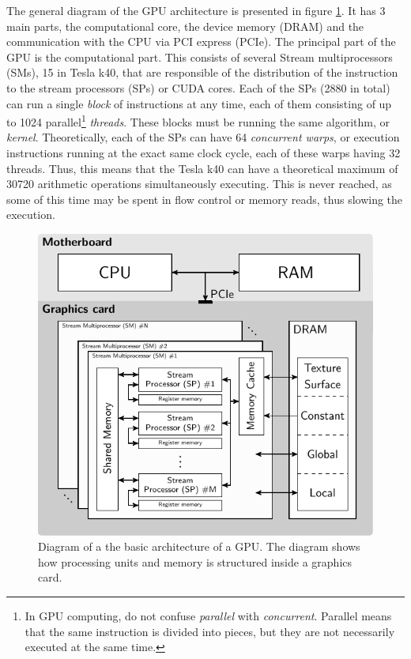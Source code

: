 The general diagram of the GPU architecture is presented in figure \ref{fig:GPUarch}. It has 3 main parts, the computational core, the device memory (DRAM) and the communication with the CPU via PCI express (PCIe).
The principal part of the GPU is the computational part. This consists of several Stream multiprocessors (SMs), 15 in Tesla k40, that are responsible of the distribution of the instruction to the stream processors (SPs) or CUDA cores. Each of the SPs (2880 in total) can run a single \textit{block} of instructions at any time, each of them consisting of up to 1024 parallel\footnote{In GPU computing, do not confuse \textit{parallel} with \textit{concurrent}. Parallel means that the same instruction is divided into pieces, but they are not necessarily executed at the same time.} \textit{threads}. These blocks must be running the same algorithm, or \textit{kernel}. Theoretically, each of the SPs can have 64 \textit{concurrent warps}, or execution instructions running at the exact same clock cycle, each of these warps having 32 threads. Thus, this means that the Tesla k40 can have a theoretical maximum of 30720 arithmetic operations simultaneously executing. This is never reached, as some of this time may be spent in flow control or memory reads, thus slowing the execution. 

\begin{figure}
\begin{center}

\includegraphics[width=\textwidth]{GPUmethods/architecture-figure0.pdf} 
\end{center}

\caption{\label{fig:GPUarch} Diagram of a the basic architecture of a GPU. The diagram shows how processing units and memory is structured inside a graphics card.} 
\end{figure}



